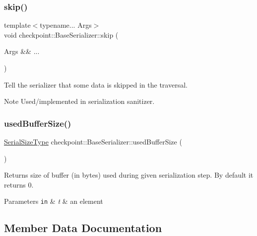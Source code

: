 \subsubsection{\texorpdfstring{skip()}{skip()}}
{\footnotesize\ttfamily template$<$typename... Args$>$ \\
void checkpoint\+::\+Base\+Serializer\+::skip (\begin{DoxyParamCaption}\item[{Args \&\&}]{... }\end{DoxyParamCaption})\hspace{0.3cm}{\ttfamily [inline]}}



Tell the serializer that some data is skipped in the traversal. 

\begin{DoxyNote}{Note}
Used/implemented in serialization sanitizer. 
\end{DoxyNote}
\mbox{\label{structcheckpoint_1_1_base_serializer_a6ccb8bb1430ac5665aac995b6330bc8a}} 
\subsubsection{\texorpdfstring{used\+Buffer\+Size()}{usedBufferSize()}}
{\footnotesize\ttfamily \hyperlink{namespacecheckpoint_a083f6674da3f94c2901b18c6d238217c}{Serial\+Size\+Type} checkpoint\+::\+Base\+Serializer\+::used\+Buffer\+Size (\begin{DoxyParamCaption}{ }\end{DoxyParamCaption})\hspace{0.3cm}{\ttfamily [inline]}}



Returns size of buffer (in bytes) used during given serialization step. By default it returns 0. 


\begin{DoxyParams}[1]{Parameters}
\mbox{\tt in}  & {\em t} & an element \\
\hline
\end{DoxyParams}


\subsection{Member Data Documentation}
\mbox{\label{structcheckpoint_1_1_base_serializer_a1755296c5fbd3cdc5df3390d20c80fae}} 
